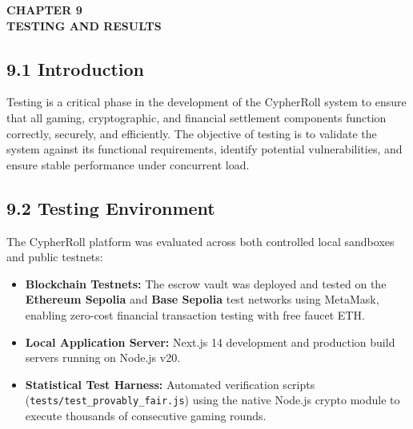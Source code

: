 \vspace*{0.5cm}
\begin{center}
\textbf{CHAPTER 9}\\[0.15cm]
\textbf{TESTING AND RESULTS}
\end{center}
\label{chap:testing}
\vspace{0.2cm}

\subsection*{9.1 Introduction}
Testing is a critical phase in the development of the CypherRoll system to ensure that all gaming, cryptographic, and financial settlement components function correctly, securely, and efficiently. The objective of testing is to validate the system against its functional requirements, identify potential vulnerabilities, and ensure stable performance under concurrent load.

\subsection*{9.2 Testing Environment}
The CypherRoll platform was evaluated across both controlled local sandboxes and public testnets:
\begin{itemize}[leftmargin=1.5em]
    \item \textbf{Blockchain Testnets:} The escrow vault was deployed and tested on the \textbf{Ethereum Sepolia} and \textbf{Base Sepolia} test networks using MetaMask, enabling zero-cost financial transaction testing with free faucet ETH.
    \item \textbf{Local Application Server:} Next.js 14 development and production build servers running on Node.js v20.
    \item \textbf{Statistical Test Harness:} Automated verification scripts (\texttt{tests/test\_provably\_fair.js}) using the native Node.js crypto module to execute thousands of consecutive gaming rounds.
\end{itemize}


